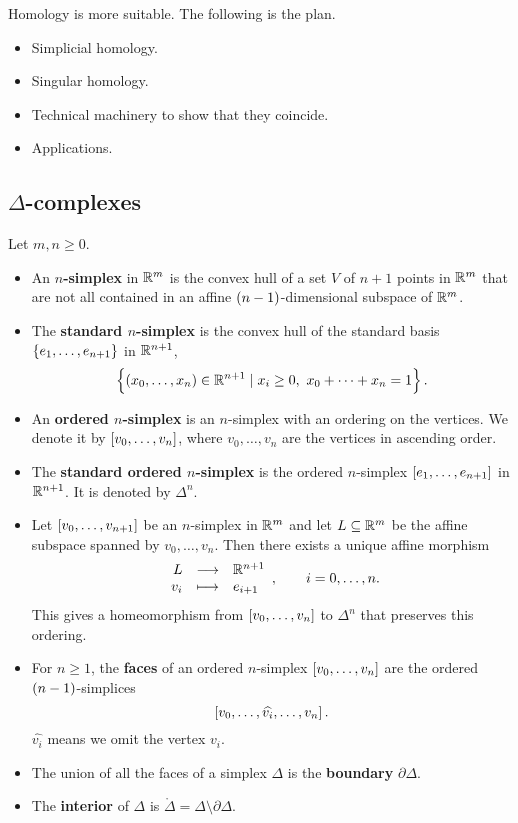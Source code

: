 Homology is more suitable. The following is the plan.
\begin{itemize}
\item Simplicial homology.
\item Singular homology.
\item Technical machinery to show that they coincide.
\item Applications.
\end{itemize}

\pagebreak

\subsection{$ \Delta $-complexes}

\begin{definition*}
Let $ m, n \ge 0 $.
\begin{itemize}
\item An \textbf{$ n $-simplex} in $ \mathbb{R}^m $ is the convex hull of a set $ V $ of $ n + 1 $ points in $ \mathbb{R}^m $ that are not all contained in an affine $ \br{n - 1} $-dimensional subspace of $ \mathbb{R}^m $.
\item The \textbf{standard $ n $-simplex} is the convex hull of the standard basis $ \cbr{e_1, \dots, e_{n + 1}} $ in $ \mathbb{R}^{n + 1} $,
$$ \cbr{\br{x_0, \dots, x_n} \in \R^{n + 1} \mid x_i \ge 0, \ x_0 + \dots + x_n = 1}. $$
\item An \textbf{ordered $ n $-simplex} is an $ n $-simplex with an ordering on the vertices. We denote it by $ \sbr{v_0, \dots, v_n} $, where $ v_0, \dots, v_n $ are the vertices in ascending order.
\item The \textbf{standard ordered $ n $-simplex} is the ordered $ n $-simplex $ \sbr{e_1, \dots, e_{n + 1}} $ in $ \mathbb{R}^{n + 1} $. It is denoted by $ \Delta^n $.
\item Let $ \sbr{v_0, \dots, v_{n + 1}} $ be an $ n $-simplex in $ \mathbb{R}^m $ and let $ L \subseteq \mathbb{R}^m $ be the affine subspace spanned by $ v_0, \dots, v_n $. Then there exists a unique affine morphism
$$ \function{L}{\R^{n + 1}}{v_i}{e_{i + 1}}, \qquad i = 0, \dots, n. $$
This gives a homeomorphism from $ \sbr{v_0, \dots, v_n} $ to $ \Delta^n $ that preserves this ordering.
\item For $ n \ge 1 $, the \textbf{faces} of an ordered $ n $-simplex $ \sbr{v_0, \dots, v_n} $ are the ordered $ \br{n - 1} $-simplices
$$ \sbr{v_0, \dots, \widehat{v_i}, \dots, v_n}. $$
$ \widehat{v_i} $ means we omit the vertex $ v_i $.
\item The union of all the faces of a simplex $ \Delta $ is the \textbf{boundary} $ \partial\Delta $.
\item The \textbf{interior} of $ \Delta $ is $ \mathring{\Delta} = \Delta \setminus \partial\Delta $.
\end{itemize}
\end{definition*}

